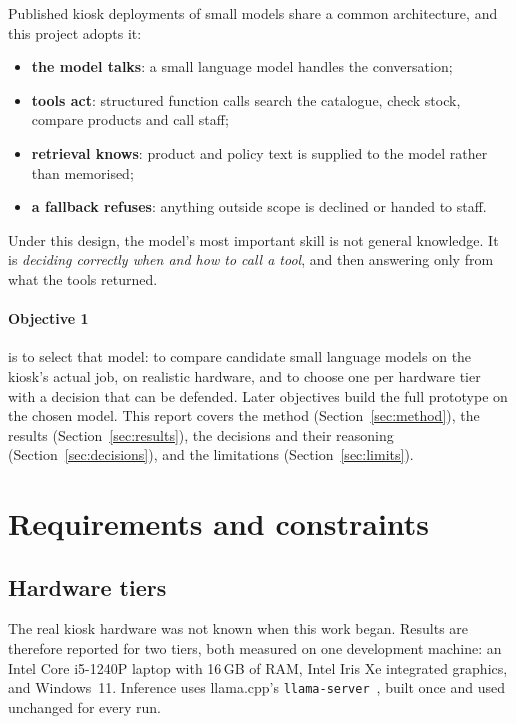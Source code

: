 \documentclass[11pt,a4paper]{article}
\begin{document}
Published kiosk deployments of small models share a common architecture, and this project adopts it:
\begin{itemize}
  \item \textbf{the model talks}: a small language model handles the conversation;
  \item \textbf{tools act}: structured function calls search the catalogue, check stock, compare products and call staff;
  \item \textbf{retrieval knows}: product and policy text is supplied to the model rather than memorised;
  \item \textbf{a fallback refuses}: anything outside scope is declined or handed to staff.
\end{itemize}
Under this design, the model's most important skill is not general knowledge. It is \emph{deciding correctly when and
how to call a tool}, and then answering only from what the tools returned.

\paragraph{Objective 1} is to select that model: to compare candidate small language models on the kiosk's actual job,
on realistic hardware, and to choose one per hardware tier with a decision that can be defended. Later objectives build
the full prototype on the chosen model. This report covers the method (Section~\ref{sec:method}), the results
(Section~\ref{sec:results}), the decisions and their reasoning (Section~\ref{sec:decisions}), and the limitations
(Section~\ref{sec:limits}).

\section{Requirements and constraints}\label{sec:reqs}

\subsection{Hardware tiers}
The real kiosk hardware was not known when this work began. Results are therefore reported for two tiers, both measured
on one development machine: an Intel Core i5-1240P laptop with 16\,GB of RAM, Intel Iris Xe integrated graphics, and
Windows~11. Inference uses llama.cpp's \texttt{llama-server}~\cite{llamacpp}, built once and used unchanged for every
run.
\end{document}
